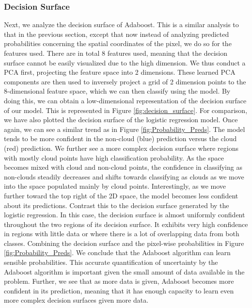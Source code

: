 \documentclass[11pt, letterpaper, journal]{IEEEtran}
\begin{document}
\subsubsection{Decision Surface}
Next, we analyze the decision surface of Adaboost. This is a similar analysis to that in the previous section, except that now instead of analyzing predicted probabilities concerning the spatial coordinates of the pixel, we do so for the features used. There are in total 8 features used, meaning that the decision surface cannot be easily visualized due to the high dimension. We thus conduct a PCA first, projecting the feature space into 2 dimensions. These learned PCA components are then used to inversely project a grid of 2 dimension points to the 8-dimensional feature space, which we can then classify using the model. By doing this, we can obtain a low-dimensional representation of the decision surface of our model. This is represented in Figure \ref{fig:decision_surface}. For comparison, we have also plotted the decision surface of the logistic regression model. Once again, we can see a similar trend as in Figure \ref{fig:Probability_Preds}. The model tends to be more confident in the non-cloud (blue) prediction versus the cloud (red) prediction. We further see a more complex decision surface where regions with mostly cloud points have high classification probability. As the space becomes mixed with cloud and non-cloud points, the confidence in classifying as non-clouds steadily decreases and shifts towards classifying as clouds as we move into the space populated mainly by cloud points. Interestingly, as we move further toward the top right of the 2D space, the model becomes less confident about its predictions. Contrast this to the decision surface generated by the logistic regression. In this case, the decision surface is almost uniformly confident throughout the two regions of its decision surface. It exhibits very high confidence in regions with little data or where there is a lot of overlapping data from both classes. Combining the decision surface and the pixel-wise probabilities in Figure \ref{fig:Probability_Preds}. We conclude that the Adaboost algorithm can learn sensible probabilities. This accurate quantification of uncertainty by the Adaboost algorithm is important given the small amount of data available in the problem. Further, we see that as more data is given, Adaboost becomes more confident in its prediction, meaning that it has enough capacity to learn even more complex decision surfaces given more data.
\end{document}
